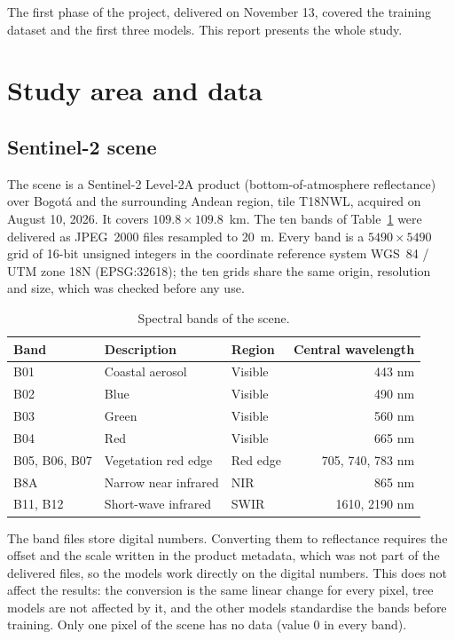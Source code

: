 \documentclass[11pt,a4paper]{article}
\begin{document}
The first phase of the project, delivered on November 13, covered the
training dataset and the first three models. This report presents the whole
study.

\section{Study area and data}

\subsection{Sentinel-2 scene}

The scene is a Sentinel-2 Level-2A product (bottom-of-atmosphere
reflectance) over Bogot\'a and the surrounding Andean region, tile T18NWL,
acquired on August 10, 2026. It covers $109.8 \times 109.8$~km. The ten bands
of Table~\ref{tab:bands} were delivered as JPEG~2000 files resampled to 20~m.
Every band is a $5490 \times 5490$ grid of 16-bit unsigned integers in the
coordinate reference system WGS~84 / UTM zone 18N (EPSG:32618); the ten
grids share the same origin, resolution and size, which was checked before
any use.

\begin{table}[H]
\centering\small
\caption{Spectral bands of the scene.}
\label{tab:bands}
\begin{tabular}{lllr}
\toprule
Band & Description & Region & Central wavelength \\
\midrule
B01 & Coastal aerosol & Visible & 443 nm \\
B02 & Blue & Visible & 490 nm \\
B03 & Green & Visible & 560 nm \\
B04 & Red & Visible & 665 nm \\
B05, B06, B07 & Vegetation red edge & Red edge & 705, 740, 783 nm \\
B8A & Narrow near infrared & NIR & 865 nm \\
B11, B12 & Short-wave infrared & SWIR & 1610, 2190 nm \\
\bottomrule
\end{tabular}
\end{table}

The band files store digital numbers. Converting them to reflectance requires
the offset and the scale written in the product metadata, which was not part
of the delivered files, so the models work directly on the digital numbers.
This does not affect the results: the conversion is the same linear change
for every pixel, tree models are not affected by it, and the other models
standardise the bands before training. Only one pixel of the scene has no
data (value 0 in every band).
\end{document}
